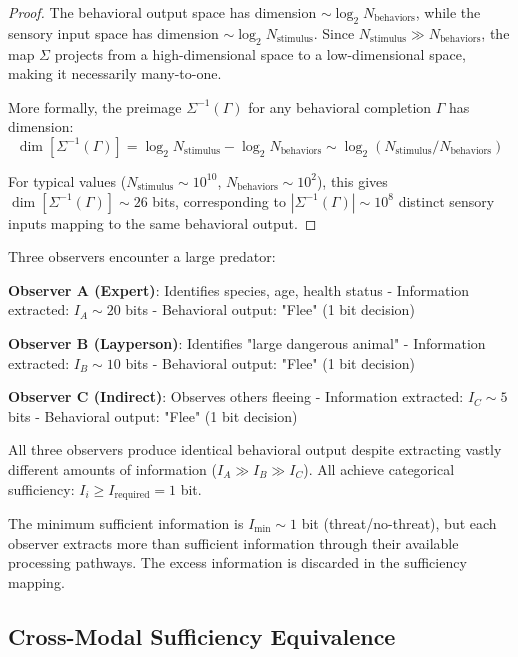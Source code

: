 \documentclass[aps,prd,twocolumn,superscriptaddress,floatfix,nofootinbib]{revtex4-2}
\theoremstyle{remark}
\begin{document}
\begin{proof}
The behavioral output space has dimension $\sim \log_2 N_{\text{behaviors}}$, while the sensory input space has dimension $\sim \log_2 N_{\text{stimulus}}$. Since $N_{\text{stimulus}} \gg N_{\text{behaviors}}$, the map $\Sigma$ projects from a high-dimensional space to a low-dimensional space, making it necessarily many-to-one.

More formally, the preimage $\Sigma^{-1}(\Gamma)$ for any behavioral completion $\Gamma$ has dimension:
$$
\dim[\Sigma^{-1}(\Gamma)] = \log_2 N_{\text{stimulus}} - \log_2 N_{\text{behaviors}} \sim \log_2(N_{\text{stimulus}} / N_{\text{behaviors}})
$$

For typical values ($N_{\text{stimulus}} \sim 10^{10}$, $N_{\text{behaviors}} \sim 10^2$), this gives $\dim[\Sigma^{-1}(\Gamma)] \sim 26$ bits, corresponding to $|\Sigma^{-1}(\Gamma)| \sim 10^8$ distinct sensory inputs mapping to the same behavioral output.
\end{proof}

\begin{example}
\label{ex:threat_sufficiency}
Three observers encounter a large predator:

\textbf{Observer A (Expert)}: Identifies species, age, health status
- Information extracted: $I_A \sim 20$ bits
- Behavioral output: "Flee" (1 bit decision)

\textbf{Observer B (Layperson)}: Identifies "large dangerous animal"
- Information extracted: $I_B \sim 10$ bits
- Behavioral output: "Flee" (1 bit decision)

\textbf{Observer C (Indirect)}: Observes others fleeing
- Information extracted: $I_C \sim 5$ bits
- Behavioral output: "Flee" (1 bit decision)

All three observers produce identical behavioral output despite extracting vastly different amounts of information ($I_A \gg I_B \gg I_C$). All achieve categorical sufficiency: $I_i \geq I_{\text{required}} = 1$ bit.

The minimum sufficient information is $I_{\text{min}} \sim 1$ bit (threat/no-threat), but each observer extracts more than sufficient information through their available processing pathways. The excess information is discarded in the sufficiency mapping.
\end{example}

\subsection{Cross-Modal Sufficiency Equivalence}
\end{document}
